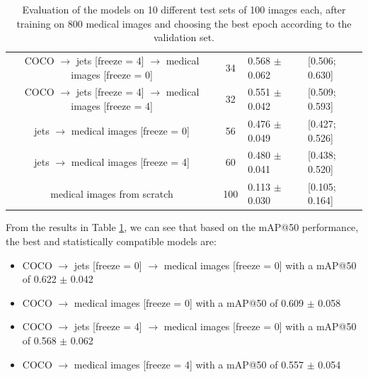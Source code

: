 \begin{table}[!ht]
{\begin{tabular}{|ccll|}
    \multicolumn{1}{|c|}{{\color[HTML]{6200C9} COCO $\to$ jets {[}freeze = 4{]} $\to$ medical images {[}freeze = 0{]}}} & \multicolumn{1}{c|}{{\color[HTML]{6200C9} 34}}  & \multicolumn{1}{l|}{{\color[HTML]{6200C9} 0.568 $\pm$ 0.062}} & {\color[HTML]{6200C9} {[}0.506; 0.630{]}} \\
    \multicolumn{1}{|c|}{{\color[HTML]{643403} COCO $\to$ jets {[}freeze = 4{]} $\to$ medical images {[}freeze = 4{]}}} & \multicolumn{1}{c|}{{\color[HTML]{643403} 32}}  & \multicolumn{1}{l|}{{\color[HTML]{643403} 0.551 $\pm$ 0.042}} & {\color[HTML]{643403} {[}0.509; 0.593{]}} \\
    \multicolumn{1}{|c|}{{\color[HTML]{F171DF} jets $\to$ medical images {[}freeze = 0{]}}}                             & \multicolumn{1}{c|}{{\color[HTML]{F171DF} 56}} & \multicolumn{1}{l|}{{\color[HTML]{F171DF} 0.476 $\pm$ 0.049}} & {\color[HTML]{F171DF} {[}0.427; 0.526{]}} \\
    \multicolumn{1}{|c|}{{\color[HTML]{9B9B9B} jets $\to$ medical images {[}freeze = 4{]}}}                             & \multicolumn{1}{c|}{{\color[HTML]{9B9B9B} 60}} & \multicolumn{1}{l|}{{\color[HTML]{9B9B9B} 0.480 $\pm$ 0.041}} & {\color[HTML]{9B9B9B} {[}0.438; 0.520{]}} \\
    \multicolumn{1}{|c|}{{\color[HTML]{9CCB44} medical images from scratch}}                                            & \multicolumn{1}{c|}{{\color[HTML]{9CCB44} 100}} & \multicolumn{1}{l|}{{\color[HTML]{9CCB44} 0.113 $\pm$ 0.030}} & {\color[HTML]{9CCB44} {[}0.105; 0.164{]}}                   \\ \hline
    \end{tabular}
    }
    \caption{Evaluation of the models on 10 different test sets of 100 images each, after training on 800 medical images and choosing the best epoch according to the validation set.}
    \label{tab:medical_results_800}
\end{table}

From the results in Table \ref{tab:medical_results_800}, we can see that based on the mAP@50 performance, the best and statistically compatible models are:
\begin{itemize}
    \item COCO $\to$ jets {[}freeze = 0{]} $\to$ medical images {[}freeze = 0{]} with a mAP@50 of 0.622 $\pm$ 0.042
    \item COCO $\to$ medical images {[}freeze = 0{]} with a mAP@50 of 0.609 $\pm$ 0.058
    \item COCO $\to$ jets {[}freeze = 4{]} $\to$ medical images {[}freeze = 0{]} with a mAP@50 of 0.568 $\pm$ 0.062
    \item COCO $\to$ medical images {[}freeze = 4{]} with a mAP@50 of 0.557 $\pm$ 0.054
\end{itemize}

